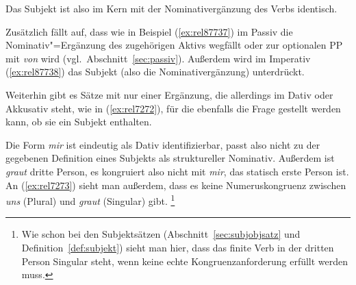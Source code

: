 Das Subjekt ist also im Kern mit der Nominativergänzung des Verbs identisch.




Zusätzlich fällt auf, dass wie in Beispiel (\ref{ex:rel87737}) im Passiv die Nominativ"=Ergänzung des zugehörigen Aktivs wegfällt oder zur optionalen PP mit \textit{von} wird (vgl.\ Abschnitt~\ref{sec:passiv}).
Außerdem wird im Imperativ (\ref{ex:rel87738}) das Subjekt (also die Nominativergänzung) unterdrückt.

\begin{exe}
  \ex\label{ex:rel87737}
  \begin{xlist}
  \end{xlist}
  \ex\label{ex:rel87738}
  \begin{xlist}
  \end{xlist}
\end{exe}

Weiterhin gibt es Sätze mit nur einer Ergänzung, die allerdings im Dativ oder Akkusativ steht, wie in (\ref{ex:rel7272}), für die ebenfalls die Frage gestellt werden kann, ob sie ein Subjekt enthalten.

\begin{exe}
\end{exe}

Die Form \textit{mir} ist eindeutig als Dativ identifizierbar, passt also nicht zu der gegebenen Definition eines Subjekts als struktureller Nominativ.
Außerdem ist \textit{graut} dritte Person, es kongruiert also nicht mit \textit{mir}, das statisch erste Person ist.
An (\ref{ex:rel7273}) sieht man außerdem, dass es keine Numeruskongruenz zwischen \textit{uns} (Plural) und \textit{graut} (Singular) gibt.%
\footnote{Wie schon bei den Subjektsätzen (Abschnitt~\ref{sec:subjobjsatz} und Definition~\ref{def:subjekt}) sieht man hier, dass das finite Verb in der dritten Person Singular steht, wenn keine echte Kongruenzanforderung erfüllt werden muss.}

